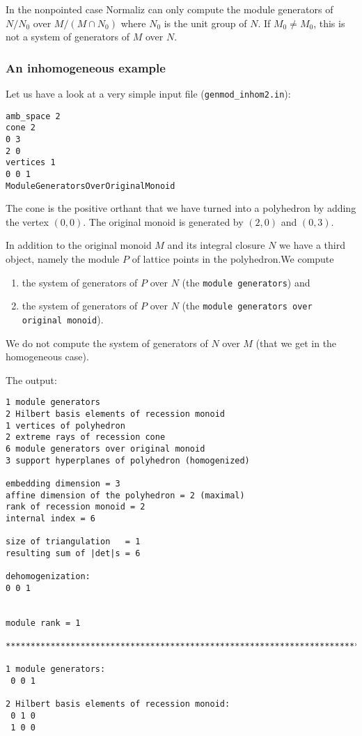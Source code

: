 \documentclass[12pt,a4paper]{scrartcl}
\theoremstyle{definition}
\begin{document}
{In the nonpointed case Normaliz can only compute the module generators of $N/N_0$ over $M/(M\cap N_0)$ where $N_0$ is the unit group of $N$. If $M_0\neq M_0$, this is not a system of generators of $M$ over $N$.

\subsubsection{An inhomogeneous example}

Let us have a look at a very simple input file (\verb|genmod_inhom2.in|):
\begin{Verbatim}
amb_space 2
cone 2
0 3
2 0
vertices 1
0 0 1
ModuleGeneratorsOverOriginalMonoid
\end{Verbatim}

The cone is the positive orthant that we have turned into a polyhedron by adding the vertex $(0,0)$. The original monoid is generated by $(2,0)$ and $(0,3)$. 

In addition to the original monoid $M$ and its integral closure $N$ we have a third object, namely the module $P$ of lattice points in the polyhedron.We compute
\begin{enumerate}
\item the system of generators of $P$ over $N$ (the \verb|module generators|) and
\item the system of generators of $P$ over $N$ (the \verb|module generators over original monoid|). 
\end{enumerate}
We do not compute the system of generators of $N$ over $M$ (that we get in the homogeneous case).

The output:
\begin{Verbatim}
1 module generators
2 Hilbert basis elements of recession monoid
1 vertices of polyhedron
2 extreme rays of recession cone
6 module generators over original monoid
3 support hyperplanes of polyhedron (homogenized)

embedding dimension = 3
affine dimension of the polyhedron = 2 (maximal)
rank of recession monoid = 2
internal index = 6

size of triangulation   = 1
resulting sum of |det|s = 6

dehomogenization:
0 0 1 


module rank = 1

***********************************************************************

1 module generators:
 0 0 1

2 Hilbert basis elements of recession monoid:
 0 1 0
 1 0 0


\end{Verbatim}}
\end{document}
